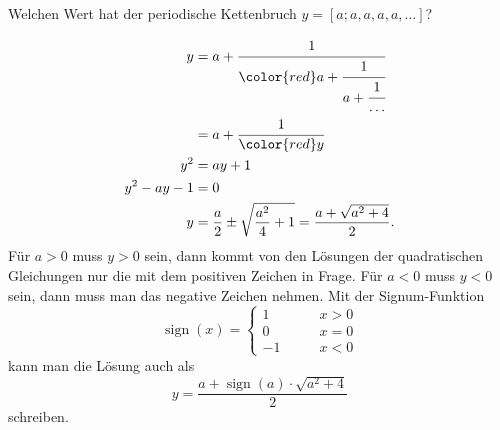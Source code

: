 Welchen Wert hat der periodische Kettenbruch 
$y=[a;a,a,a,a,\dots]$?


\begin{loesung}
\begin{align*}
y&=a+\cfrac{1}{{\color{red}a+\cfrac{1}{a+\cfrac{1}{\dots}}}}
\\
&=
a+\cfrac{1}{{\color{red}y}}
\\
y^2&=ay + 1
\\
y^2-ay-1&=0
\\
y&=\frac{a}{2}\pm\sqrt{\frac{a^2}{4}+1}
=
\frac{a+\sqrt{a^2+4}}2.
\end{align*}
Für $a>0$ muss $y>0$ sein, dann kommt von den Lösungen der quadratischen
Gleichungen nur die mit dem positiven Zeichen in Frage.
Für $a<0$ muss $y<0$ sein, dann muss man das negative Zeichen nehmen.
Mit der Signum-Funktion
\[
\operatorname{sign}(x) =
\begin{cases}
1&\qquad x> 0\\
0&\qquad x=0\\
-1&\qquad x<0
\end{cases}
\]
kann man die Lösung auch als
\[
y = \frac{a+\operatorname{sign}(a)\cdot\sqrt{a^2+4}}2
\]
schreiben.
\end{loesung}
